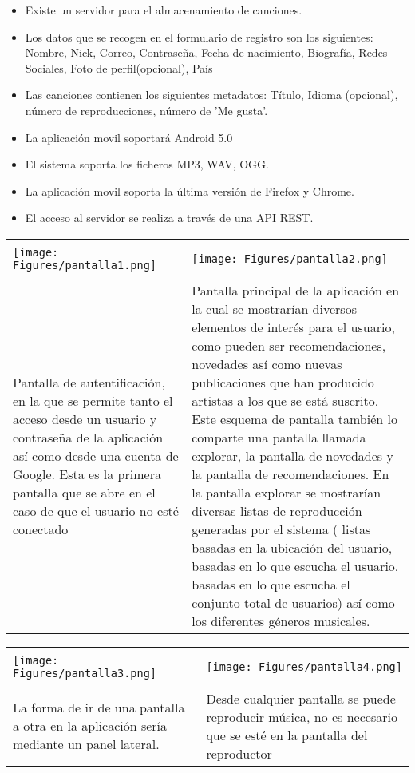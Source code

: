 \begin{itemize}
\item Existe un servidor para el almacenamiento de canciones.
\item Los datos que se recogen en el formulario de registro son los siguientes: Nombre, Nick, Correo, Contraseña, Fecha de nacimiento, Biografía, Redes Sociales, Foto de perfil(opcional), País
\item Las canciones contienen los siguientes metadatos: Título, Idioma (opcional), número de reproducciones, número de 'Me gusta'.
\item La aplicación movil soportará Android 5.0
\item El sistema soporta los ficheros MP3, WAV, OGG.
\item La aplicación movil soporta la última versión de Firefox y Chrome.
\item El acceso al servidor se realiza a través de una API REST.
\end{itemize}

\begin{tabular}{ p{6cm} p{6cm}}
\hline
\\
\texttt{[image: Figures/pantalla1.png]}
&
\texttt{[image: Figures/pantalla2.png]} \\
\hline
\\
Pantalla de autentificación, en la que se permite tanto el acceso desde un usuario y contraseña de la aplicación así como desde una cuenta de Google. Esta es la primera pantalla que se abre en el caso de que el usuario no esté conectado
&
Pantalla principal de la aplicación en la cual se mostrarían diversos elementos de interés para el usuario, como pueden ser recomendaciones, novedades así como nuevas publicaciones que han producido artistas a los que se está suscrito.
Este esquema de pantalla también lo comparte una pantalla llamada explorar, la pantalla de novedades y la pantalla de recomendaciones.
En la pantalla explorar se mostrarían diversas listas de reproducción generadas por el sistema ( listas basadas en la ubicación del usuario, basadas en lo que escucha el usuario, basadas en lo que escucha el conjunto total de usuarios) así como los diferentes géneros musicales.  \\
\hline
\end{tabular}

\begin{tabular}{ p{6cm} p{6cm}}
\hline
\\
\texttt{[image: Figures/pantalla3.png]}
&
\texttt{[image: Figures/pantalla4.png]} \\
\hline
\\
La forma de ir de una pantalla a otra en la aplicación sería mediante un panel lateral.
&
Desde cualquier pantalla se puede reproducir música, no es necesario que se esté en la pantalla del reproductor \\
\hline
\end{tabular}

